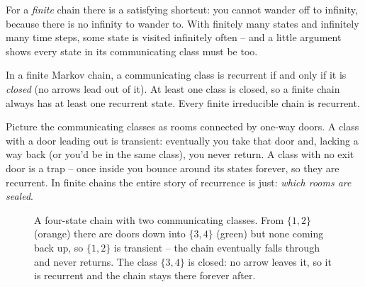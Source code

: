 For a \emph{finite} chain there is a satisfying shortcut: you cannot wander off to infinity,
because there is no infinity to wander to. With finitely many states and infinitely many time
steps, some state is visited infinitely often -- and a little argument shows every state in
its communicating class must be too.

\begin{proposition}
\label{ch23:finite-recurrence}
In a finite Markov chain, a communicating class is recurrent if and only if it is
\emph{closed} (no arrows lead out of it). At least one class is closed, so a finite chain
always has at least one recurrent state. Every finite irreducible chain is recurrent.
\end{proposition}

\begin{intuitionbox}
Picture the communicating classes as rooms connected by one-way doors. A class with a door
leading out is transient: eventually you take that door and, lacking a way back (or you'd be
in the same class), you never return. A class with no exit door is a trap -- once inside you
bounce around its states forever, so they are recurrent. In finite chains the entire story of
recurrence is just: \emph{which rooms are sealed}.
\end{intuitionbox}

\begin{figure}[H]
\centering
{}
\caption{A four-state chain with two communicating classes. From $\{1,2\}$ (orange) there are
doors down into $\{3,4\}$ (green) but none coming back up, so $\{1,2\}$ is transient -- the
chain eventually falls through and never returns. The class $\{3,4\}$ is closed: no arrow
leaves it, so it is recurrent and the chain stays there forever after.}
\label{ch23:fig-classes}
\end{figure}

